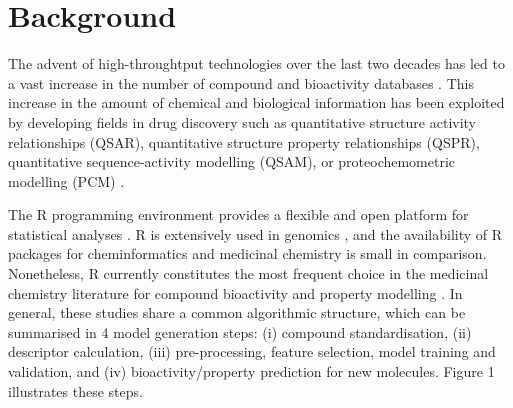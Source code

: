 \documentclass{bmcart}
\begin{document}


\section*{Background}
The advent of high-throughtput technologies over the last two decades 
has led to a vast increase in the number of compound and bioactivity databases \cite{bender_databases,chembl,pubchem}.
This increase in the amount of chemical and biological information 
has been exploited by developing fields in drug discovery 
such as quantitative structure activity relationships (QSAR), 
quantitative structure property relationships (QSPR), quantitative sequence-activity modelling (QSAM), 
or proteochemometric modelling (PCM) \cite{review_pcm,cortesReview}.

The R programming environment provides a flexible and open platform for statistical analyses \cite{Rlanguage}.
R is extensively used in genomics \cite{bioconductor},
and the availability of R packages for cheminformatics and medicinal chemistry is small in comparison.
Nonetheless, R currently constitutes the most frequent choice in the medicinal chemistry literature
for compound bioactivity and property modelling \cite{mente}.
In general, these studies share a common algorithmic structure, which can be summarised in 4 model generation steps:
(i) compound standardisation, (ii) descriptor calculation,
(iii) pre-processing, feature selection, model training and validation, and (iv) bioactivity/property prediction for new molecules.
Figure 1 illustrates these steps.
\end{document}
